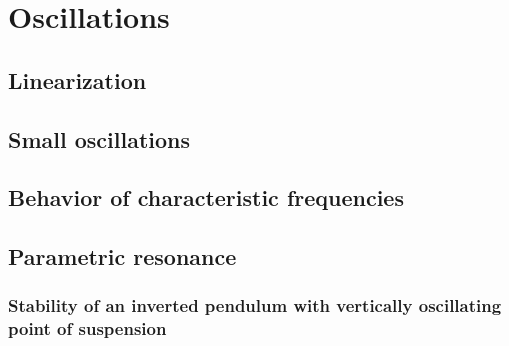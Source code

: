\documentclass[leqno]{book}
\numberwithin{equation}{section}
\theoremstyle{plain}
\theoremstyle{definition}
\theoremstyle{remark}
\theoremstyle{smallcap}
\numberwithin{prob}{section}
\begin{document}
\chapter{Oscillations}

\section{Linearization}

\section{Small oscillations}

\section{Behavior of characteristic frequencies}

\section{Parametric resonance}

\setcounter{subsection}{4}
\subsection{Stability of an inverted pendulum with vertically
  oscillating point of suspension}
\end{document}
